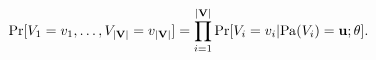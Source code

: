 	\begin{align}
	\Pr[V_1=v_1, \dots, V_{|\mathbf{V}|}=v_{|\mathbf{V}|}] = \prod_{i=1}^{|\mathbf{V}|} \Pr[V_i = v_i | \mathrm{Pa}(V_i) = \mathbf{u}; \theta].
	\label{fairness_fvgm_eq:BN}
	\end{align}

	\iffalse	
	$ \factors $ contains a factor $ \factor $ representing a function over the  assignment or valuation of  $ \{V_i\} \cup \parent(V_i)  $. Let $ v $ and $ \mathbf{u} $ denote an assignment of $ V_i $ and $ \parent(V_i) $, respectively. 	Formally a factor $ \factor(V_i = v, \parent(V_i) = \mathbf{u}) \triangleq  \Pr[V_i = v | \parent(V_i) = \mathbf{u}] $ denotes the conditional probability of $ V_i = v $ given $ \parent(V_i) = \mathbf{u} $. Avoiding notation clutter, we drop $ v $ and $ \mathbf{u} $ and use $ \factor(V_i, \parent(V_i)) \triangleq  \Pr[V_i| \parent(V_i)] $, when it is clear from the context.
	\fi
	